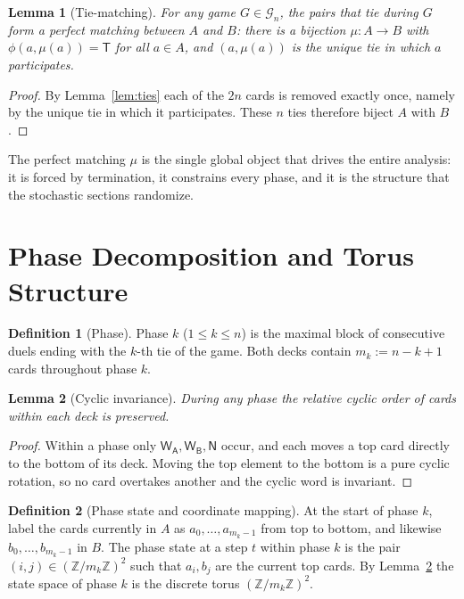\documentclass[11pt]{article}
\newtheorem{lemma}{Lemma}
\theoremstyle{definition}
\newtheorem{definition}{Definition}
\theoremstyle{remark}
\newcommand{\WA}{\mathsf{W_A}}
\newcommand{\WB}{\mathsf{W_B}}
\newcommand{\TT}{\mathsf{T}}
\newcommand{\NN}{\mathsf{N}}
\newcommand{\Z}{\mathbb{Z}}
\begin{document}
\begin{lemma}[Tie-matching]\label{lem:match}
For any game $G \in \mathcal G_n$, the pairs that tie during $G$ form a perfect matching between $A$ and $B$: there is a
bijection $\mu : A \to B$ with $\phi(a, \mu(a)) = \TT$ for all $a \in A$, and $(a, \mu(a))$ is the unique tie in which
$a$ participates.
\end{lemma}
\begin{proof}
By Lemma~\ref{lem:ties} each of the $2n$ cards is removed exactly once, namely by the unique tie in which it
participates. These $n$ ties therefore biject $A$ with $B$.
\end{proof}

The perfect matching $\mu$ is the single global object that drives the entire analysis: it is forced by termination,
it constrains every phase, and it is the structure that the stochastic sections randomize.

\section{Phase Decomposition and Torus Structure}\label{sec:phase}
\begin{definition}[Phase]
Phase $k$ ($1 \le k \le n$) is the maximal block of consecutive duels ending with the $k$-th tie of the game. Both
decks contain $m_k := n - k + 1$ cards throughout phase $k$.
\end{definition}

\begin{lemma}[Cyclic invariance]\label{lem:cyclic}
During any phase the relative cyclic order of cards within each deck is preserved.
\end{lemma}
\begin{proof}
Within a phase only $\WA, \WB, \NN$ occur, and each moves a top card directly to the bottom of its deck. Moving the
top element to the bottom is a pure cyclic rotation, so no card overtakes another and the cyclic word is invariant.
\end{proof}

\begin{definition}[Phase state and coordinate mapping]
At the start of phase $k$, label the cards currently in $A$ as $a_0, \dots, a_{m_k-1}$ from top to bottom, and likewise
$b_0, \dots, b_{m_k-1}$ in $B$. The phase state at a step $t$ within phase $k$ is the pair $(i, j) \in (\Z/m_k\Z)^2$
such that $a_i, b_j$ are the current top cards. By Lemma~\ref{lem:cyclic} the state space of phase $k$ is the discrete
torus $(\Z/m_k\Z)^2$.
\end{definition}
\end{document}
